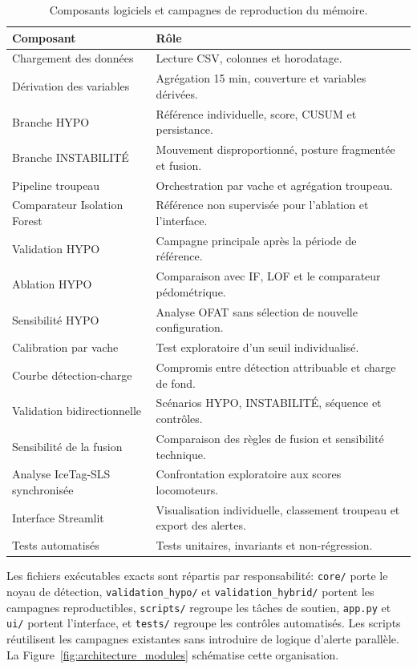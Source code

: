 \begin{table}[H]
  \centering
  \caption{Composants logiciels et campagnes de reproduction du mémoire.}
  \label{tab:modules}
  \begingroup
  \normalsize
  \setlength{\tabcolsep}{5pt}
  \renewcommand{\arraystretch}{1.00}
  \begin{tabular}{p{}p{}}
    \toprule
    Composant & Rôle \\
    \midrule
    Chargement des données & Lecture CSV, colonnes et horodatage. \\
    Dérivation des variables & Agrégation 15 min, couverture et variables dérivées. \\
    Branche HYPO & Référence individuelle, score, CUSUM et persistance. \\
    Branche INSTABILITÉ & Mouvement disproportionné, posture fragmentée et fusion. \\
    Pipeline troupeau & Orchestration par vache et agrégation troupeau. \\
    Comparateur Isolation Forest & Référence non supervisée pour l'ablation et l'interface. \\
    Validation HYPO & Campagne principale après la période de référence. \\
    Ablation HYPO & Comparaison avec IF, LOF et le comparateur pédométrique. \\
    Sensibilité HYPO & Analyse OFAT sans sélection de nouvelle configuration. \\
    Calibration par vache & Test exploratoire d'un seuil individualisé. \\
    Courbe détection-charge & Compromis entre détection attribuable et charge de fond. \\
    Validation bidirectionnelle & Scénarios HYPO, INSTABILITÉ, séquence et contrôles. \\
    Sensibilité de la fusion & Comparaison des règles de fusion et sensibilité technique. \\
    Analyse IceTag-SLS synchronisée & Confrontation exploratoire aux scores locomoteurs. \\
    Interface Streamlit & Visualisation individuelle, classement troupeau et export des alertes. \\
    Tests automatisés & Tests unitaires, invariants et non-régression. \\
    \bottomrule
  \end{tabular}
  \endgroup
\end{table}

Les fichiers exécutables exacts sont répartis par responsabilité: \texttt{core/} porte le
noyau de détection, \texttt{validation\_hypo/} et \texttt{validation\_hybrid/} portent les
campagnes reproductibles, \texttt{scripts/} regroupe les tâches de soutien, \texttt{app.py}
et \texttt{ui/} portent l'interface, et \texttt{tests/} regroupe les contrôles automatisés.
Les scripts réutilisent les campagnes existantes sans introduire de logique d'alerte
parallèle. La Figure~\ref{fig:architecture_modules} schématise cette organisation.

